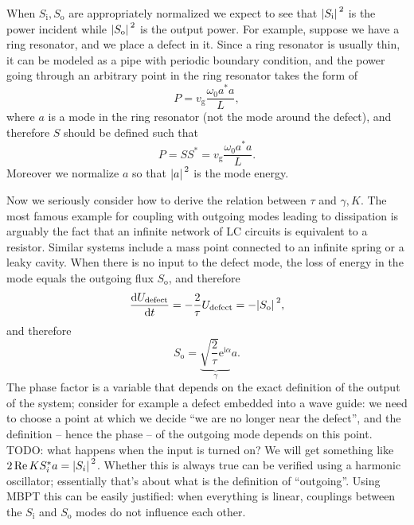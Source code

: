 \documentclass[hyperref, a4paper]{article}
\newcommand*{\ii}{\mathrm{i}}
\newcommand*{\ee}{\mathrm{e}}
\newcommand*{\vg}{v_{\text{g}}}
\newcommand*{\Si}{S_{\text{i}}}
\newcommand*{\So}{S_{\text{o}}}
\begin{document}
When $\Si, \So$ are appropriately normalized we expect to see that 
$\abs*{\Si}^2$ is the power incident while 
$\abs*{\So}^2$ is the output power.
For example, suppose we have a ring resonator, and we place a defect in it.
Since a ring resonator is usually thin, 
it can be modeled as a pipe with periodic boundary condition, 
and the power going through an arbitrary point in the ring resonator takes the form of 
\begin{equation}
    P = \vg \frac{\omega_0 a^* a}{L}, 
\end{equation}
where $a$ is a mode in the ring resonator (not the mode around the defect),
and therefore $S$ should be defined such that 
\begin{equation}
    P = S S^* = \vg \frac{\omega_0 a^* a}{L}.
\end{equation}
Moreover we normalize $a$ so that $\abs*{a}^2$ is the mode energy.

Now we seriously consider how to derive the relation between $\tau$ and $\gamma, K$.
The most famous example for coupling with outgoing modes leading to dissipation 
is arguably the fact that an infinite network of LC circuits is equivalent to a resistor.
Similar systems include a mass point connected to an infinite spring or a leaky cavity.
When there is no input to the defect mode, 
the loss of energy in the mode equals the outgoing flux $\So$, and therefore 
\begin{equation}
    \dv{U_{\text{defect}}}{t} = - \frac{2}{\tau} U_{\text{defect}}
    = - \abs*{\So}^2,
\end{equation}
and therefore 
\begin{equation}
    \So = \underbrace{\sqrt{\frac{2}{\tau}} \ee^{\ii \alpha}}_\gamma a.
\end{equation}
The phase factor is a variable that depends on the exact definition of the output of the system;
consider for example a defect embedded into a wave guide: 
we need to choose a point at which we decide ``we are no longer near the defect'', 
and the definition -- hence the phase -- of the outgoing mode depends on this point.
TODO: what happens when the input is turned on? 
We will get something like $2\Re K S_i^* a = \abs*{S_i}^2$.
Whether this is always true can be verified using a harmonic oscillator; 
essentially that's about what is the definition of ``outgoing''. 
Using MBPT this can be easily justified:
when everything is linear, couplings between the $\Si$ and $\So$ modes do not influence each other.
\end{document}
